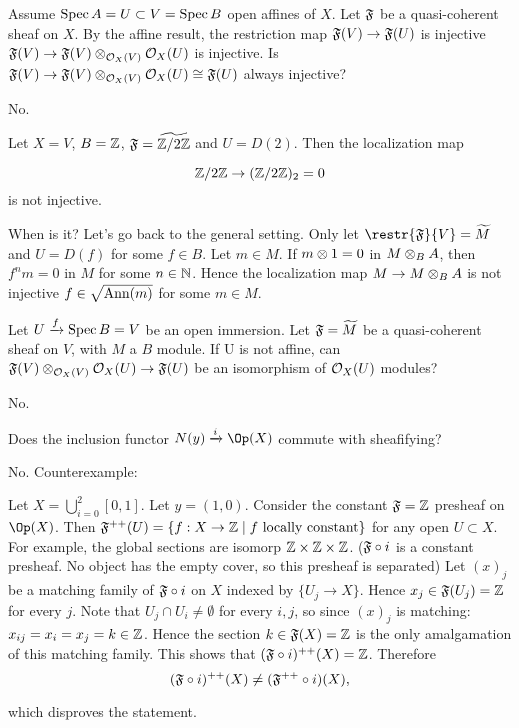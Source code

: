 \begin{question}
Assume $\Spec A = U \subset V = \Spec B$ open affines of $X$.
Let $\mathfrak{F}$ be a quasi-coherent sheaf on $X$.
By the affine result, the restriction map $\mathfrak{F}(V) \rightarrow \mathfrak{F}(U)$ is injective \iff $\mathfrak{F}(V) \rightarrow \mathfrak{F}(V)\otimes_{\mathcal{O}_X(V)}\mathcal{O}_X(U)$ is injective.
Is $\mathfrak{F}(V) \rightarrow \mathfrak{F}(V)\otimes_{\mathcal{O}_X(V)} \mathcal{O}_X(U) \cong \mathfrak{F}(U)$ always injective?
\end{question}
\begin{Qanswer}
No.

Let $X=V$, $B= \mathbb{Z}$, $\mathfrak{F}= \widetilde{\mathbb{Z}/2\mathbb{Z}}$ and $U= D(2)$.
Then the localization map 

\[ \mathbb{Z}/2\mathbb{Z} \rightarrow (\mathbb{Z}/2\mathbb{Z})_2 = 0\]
is not injective. 

\bigskip
When is it?
Let's go back to the general setting. 
Only let $\restr{\shf}{V}= \widetilde{M}$ and $U= D(f)$ for some $f \in B$.
Let $m\in M$. If $m \otimes 1 = 0$ in $M\otimes_B A$, then $f^n m = 0$ in $M$ for some $n\in \mathbb{N}$.
Hence the localization map $M\rightarrow M\otimes_B A$ is not injective \iff $f\in \sqrt{\mbox{Ann}(m)}$ for some $m\in M$.
\end{Qanswer}


\begin{question}
Let $U \xrightarrow{f} \Spec B = V$ be an open immersion.
Let $\mathfrak{F}=\widetilde{M}$ be a quasi-coherent sheaf on $V$, with $M$ a $B$ module. 
If U is not affine, can $\mathfrak{F}(V)\otimes_{\mathcal{O}_X(V)} \mathcal{O}_X(U) \rightarrow \mathfrak{F}(U)$ be an isomorphism of $\mathcal{O}_X(U)$ modules?
\end{question}
\begin{Qanswer}
No.
\end{Qanswer}


\begin{question}
Does the inclusion functor $N(y)\xrightarrow{i} \Op(X)$ commute with sheafifying?
\end{question}
\begin{Qanswer}
No. Counterexample: 

Let $X=\bigcup_{i=0}^2 [0,1]$. Let $y=(1,0)$. Consider the constant $\mathfrak{F}=\mathbb{Z}$ presheaf on $\Op(X)$. 
Then $\mathfrak{F}^{++}(U)=\{ f:X\rightarrow \mathbb{Z} \mid f \mbox{ locally constant}\}$ for any open $U\subset X$.
For example, the global sections are isomorp $\mathbb{Z}\times\mathbb{Z}\times \mathbb{Z}$.
($\mathfrak{F}\circ i$ is a constant presheaf. No object has the empty cover, so this presheaf is separated)
Let $(x)_j$ be a matching family of $\mathfrak{F}\circ i$ on $X$ indexed by $\{U_j\rightarrow X\}$.
Hence $x_j\in \mathfrak{F}(U_j)=\mathbb{Z}$ for every $j$. 
Note that $U_j\cap U_i \neq \emptyset$ for every $i,j$, so since $(x)_j$ is matching: $x_{ij} = x_i = x_j=k \in \mathbb{Z}$.
Hence the section $k\in \mathfrak{F}(X)=\mathbb{Z}$ is the only amalgamation of this matching family. This shows that $(\mathfrak{F}\circ i)^{++}(X)=\mathbb{Z}$.
Therefore 
\[(\mathfrak{F}\circ i)^{++}(X) \neq (\mathfrak{F}^{++} \circ i)(X),\]

which disproves the statement.

\end{Qanswer}

